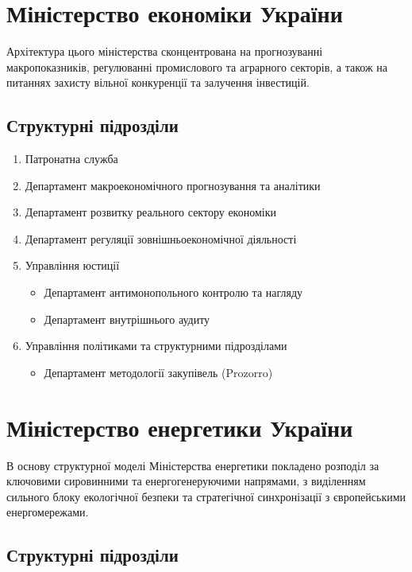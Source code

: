 \newpage
\section{Міністерство економіки України}

Архітектура цього міністерства сконцентрована на прогнозуванні макропоказників, регулюванні промислового та аграрного секторів, а також на питаннях захисту вільної конкуренції та залучення інвестицій.

\subsection*{Структурні підрозділи}

\begin{enumerate}
    \item Патронатна служба
    \item Департамент макроекономічного прогнозування та аналітики
    \item Департамент розвитку реального сектору економіки
    \item Департамент регуляції зовнішньоекономічної діяльності
    \item Управління юстиції
    \begin{itemize}
        \item Департамент антимонопольного контролю та нагляду
        \item Департамент внутрішнього аудиту
    \end{itemize}
    \item Управління політиками та структурними підрозділами
    \begin{itemize}
        \item Департамент методології закупівель (Prozorro)
    \end{itemize}
\end{enumerate}

\newpage
\section{Міністерство енергетики України}

В основу структурної моделі Міністерства енергетики покладено розподіл за ключовими сировинними та енергогенеруючими напрямами, з виділенням сильного блоку екологічної безпеки та стратегічної синхронізації з європейськими енергомережами.

\subsection*{Структурні підрозділи}

